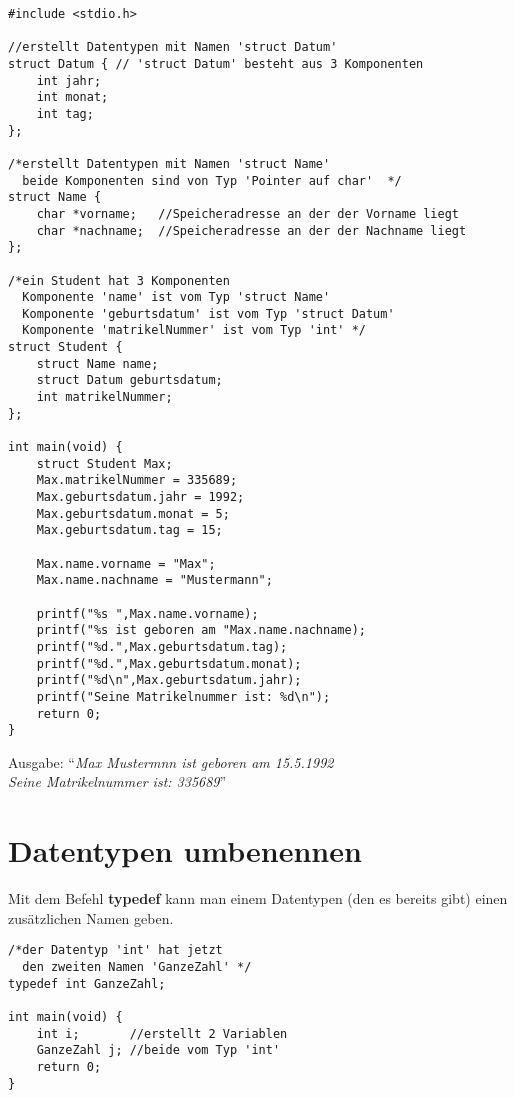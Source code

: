 \documentclass[c_worksheet.tex]{subfiles}
\begin{document}
\begin{lstlisting}
#include <stdio.h>

//erstellt Datentypen mit Namen 'struct Datum'
struct Datum { // 'struct Datum' besteht aus 3 Komponenten
    int jahr;
    int monat;
    int tag;
};

/*erstellt Datentypen mit Namen 'struct Name'
  beide Komponenten sind von Typ 'Pointer auf char'  */
struct Name { 
    char *vorname;   //Speicheradresse an der der Vorname liegt
    char *nachname;  //Speicheradresse an der der Nachname liegt
};

/*ein Student hat 3 Komponenten
  Komponente 'name' ist vom Typ 'struct Name'
  Komponente 'geburtsdatum' ist vom Typ 'struct Datum'
  Komponente 'matrikelNummer' ist vom Typ 'int' */
struct Student {
    struct Name name;
    struct Datum geburtsdatum; 
    int matrikelNummer; 
};

int main(void) {
    struct Student Max;
    Max.matrikelNummer = 335689;
    Max.geburtsdatum.jahr = 1992;
    Max.geburtsdatum.monat = 5;
    Max.geburtsdatum.tag = 15;

    Max.name.vorname = "Max";
    Max.name.nachname = "Mustermann";

    printf("%s ",Max.name.vorname);
    printf("%s ist geboren am "Max.name.nachname);
    printf("%d.",Max.geburtsdatum.tag);
    printf("%d.",Max.geburtsdatum.monat);
    printf("%d\n",Max.geburtsdatum.jahr);
    printf("Seine Matrikelnummer ist: %d\n");
    return 0;
}
\end{lstlisting}

\begin{tabbing}
Ausgabe: ``\=\textit{Max Mustermnn ist geboren am 15.5.1992}\\
           \>\textit{Seine Matrikelnummer ist: 335689}''
\end{tabbing}

\section{Datentypen umbenennen}

Mit dem Befehl \textbf{typedef} kann man einem Datentypen (den es bereits gibt) einen zusätzlichen Namen geben.

\begin{lstlisting}
/*der Datentyp 'int' hat jetzt
  den zweiten Namen 'GanzeZahl' */
typedef int GanzeZahl;

int main(void) {
    int i;       //erstellt 2 Variablen
    GanzeZahl j; //beide vom Typ 'int'
    return 0;
}
\end{lstlisting}
\end{document}
